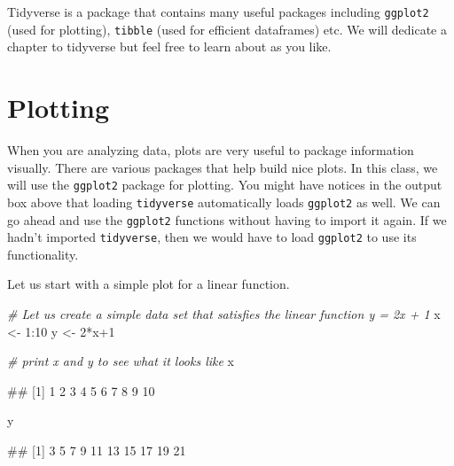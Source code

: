 \documentclass[
]{book}
\newenvironment{Shaded}{\begin{snugshade}}{\end{snugshade}}
\newcommand{\CommentTok}[1]{\textcolor[rgb]{0.56,0.35,0.01}{\textit{#1}}}
\newcommand{\DecValTok}[1]{\textcolor[rgb]{0.00,0.00,0.81}{#1}}
\newcommand{\NormalTok}[1]{#1}
\newcommand{\OtherTok}[1]{\textcolor[rgb]{0.56,0.35,0.01}{#1}}
\newcommand{\SpecialCharTok}[1]{\textcolor[rgb]{0.00,0.00,0.00}{#1}}
\begin{document}
Tidyverse is a package that contains many useful packages including \texttt{ggplot2} (used for plotting), \texttt{tibble} (used for efficient dataframes) etc. We will dedicate a chapter to tidyverse but feel free to learn about as you like.

\hypertarget{plotting}{%
\section{Plotting}\label{plotting}}

When you are analyzing data, plots are very useful to package information visually. There are various packages that help build nice plots. In this class, we will use the \texttt{ggplot2} package for plotting. You might have notices in the output box above that loading \texttt{tidyverse} automatically loads \texttt{ggplot2} as well. We can go ahead and use the \texttt{ggplot2} functions without having to import it again. If we hadn't imported \texttt{tidyverse}, then we would have to load \texttt{ggplot2} to use its functionality.

Let us start with a simple plot for a linear function.

\begin{Shaded}
\begin{Highlighting}[]
\CommentTok{\# Let us create a simple data set that satisfies the linear function y = 2x + 1}
\NormalTok{x }\OtherTok{\textless{}{-}} \DecValTok{1}\SpecialCharTok{:}\DecValTok{10}
\NormalTok{y }\OtherTok{\textless{}{-}} \DecValTok{2}\SpecialCharTok{*}\NormalTok{x}\SpecialCharTok{+}\DecValTok{1}

\CommentTok{\# print x and y to see what it looks like}
\NormalTok{x}
\end{Highlighting}
\end{Shaded}

\begin{Shaded}
\begin{Highlighting}[]
\NormalTok{\#\#  [1]  1  2  3  4  5  6  7  8  9 10}
\end{Highlighting}
\end{Shaded}

\begin{Shaded}
\begin{Highlighting}[]
\NormalTok{y}
\end{Highlighting}
\end{Shaded}

\begin{Shaded}
\begin{Highlighting}[]
\NormalTok{\#\#  [1]  3  5  7  9 11 13 15 17 19 21}
\end{Highlighting}
\end{Shaded}
\end{document}
